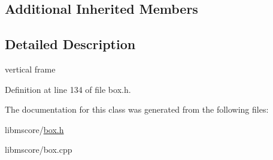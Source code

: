 \subsection*{Additional Inherited Members}


\subsection{Detailed Description}
vertical frame 

Definition at line 134 of file box.\+h.



The documentation for this class was generated from the following files\+:\begin{DoxyCompactItemize}
\item 
libmscore/\hyperlink{box_8h}{box.\+h}\item 
libmscore/box.\+cpp\end{DoxyCompactItemize}
